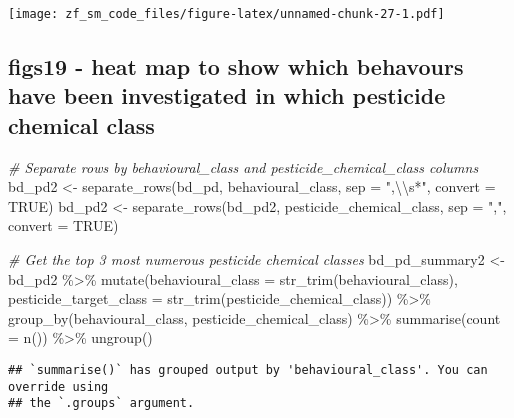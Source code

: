 \documentclass[
]{article}
\newenvironment{Shaded}{\begin{snugshade}}{\end{snugshade}}
\newcommand{\AttributeTok}[1]{\textcolor[rgb]{0.77,0.63,0.00}{#1}}
\newcommand{\CommentTok}[1]{\textcolor[rgb]{0.56,0.35,0.01}{\textit{#1}}}
\newcommand{\ConstantTok}[1]{\textcolor[rgb]{0.00,0.00,0.00}{#1}}
\newcommand{\FunctionTok}[1]{\textcolor[rgb]{0.00,0.00,0.00}{#1}}
\newcommand{\NormalTok}[1]{#1}
\newcommand{\OtherTok}[1]{\textcolor[rgb]{0.56,0.35,0.01}{#1}}
\newcommand{\SpecialCharTok}[1]{\textcolor[rgb]{0.00,0.00,0.00}{#1}}
\newcommand{\StringTok}[1]{\textcolor[rgb]{0.31,0.60,0.02}{#1}}
\begin{document}
\texttt{[image: zf\_sm\_code\_files/figure-latex/unnamed-chunk-27-1.pdf]}

\hypertarget{figs19---heat-map-to-show-which-behavours-have-been-investigated-in-which-pesticide-chemical-class}{%
\subsection{figs19 - heat map to show which behavours have been
investigated in which pesticide chemical
class}\label{figs19---heat-map-to-show-which-behavours-have-been-investigated-in-which-pesticide-chemical-class}}

\begin{Shaded}
\begin{Highlighting}[]
\CommentTok{\# Separate rows by behavioural\_class and pesticide\_chemical\_class columns}
\NormalTok{bd\_pd2 }\OtherTok{\textless{}{-}} \FunctionTok{separate\_rows}\NormalTok{(bd\_pd, behavioural\_class, }\AttributeTok{sep =} \StringTok{",}\SpecialCharTok{\textbackslash{}\textbackslash{}}\StringTok{s*"}\NormalTok{, }\AttributeTok{convert =} \ConstantTok{TRUE}\NormalTok{)}
\NormalTok{bd\_pd2 }\OtherTok{\textless{}{-}} \FunctionTok{separate\_rows}\NormalTok{(bd\_pd2, pesticide\_chemical\_class, }\AttributeTok{sep =} \StringTok{","}\NormalTok{, }\AttributeTok{convert =} \ConstantTok{TRUE}\NormalTok{)}

\CommentTok{\# Get the top 3 most numerous pesticide chemical classes}
\NormalTok{bd\_pd\_summary2 }\OtherTok{\textless{}{-}}\NormalTok{ bd\_pd2 }\SpecialCharTok{\%\textgreater{}\%}
  \FunctionTok{mutate}\NormalTok{(}\AttributeTok{behavioural\_class =} \FunctionTok{str\_trim}\NormalTok{(behavioural\_class),}
         \AttributeTok{pesticide\_target\_class =} \FunctionTok{str\_trim}\NormalTok{(pesticide\_chemical\_class)) }\SpecialCharTok{\%\textgreater{}\%}
  \FunctionTok{group\_by}\NormalTok{(behavioural\_class, pesticide\_chemical\_class) }\SpecialCharTok{\%\textgreater{}\%}
  \FunctionTok{summarise}\NormalTok{(}\AttributeTok{count =} \FunctionTok{n}\NormalTok{()) }\SpecialCharTok{\%\textgreater{}\%}
  \FunctionTok{ungroup}\NormalTok{() }
\end{Highlighting}
\end{Shaded}

\begin{verbatim}
## `summarise()` has grouped output by 'behavioural_class'. You can override using
## the `.groups` argument.
\end{verbatim}
\end{document}
